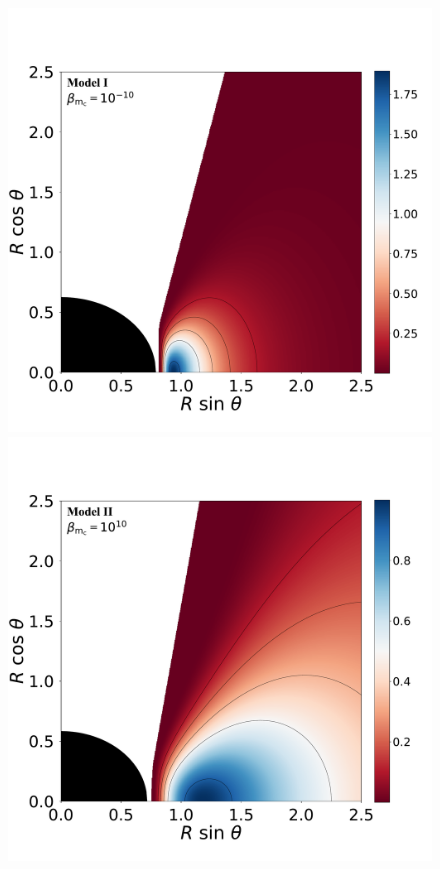 \documentclass[twocolumn,aps,showpacs,showkeys,prd,superscriptaddress,byrevtex, amsmath]{revtex4-1}
\begin{document}
\begin{figure}
\hspace{-0.2cm}
\includegraphics[scale=0.14]{figures/fig3_I__10.pdf}
\\
\includegraphics[scale=0.14]{figures/fig3_II_10.pdf}

\end{figure}
\end{document}
